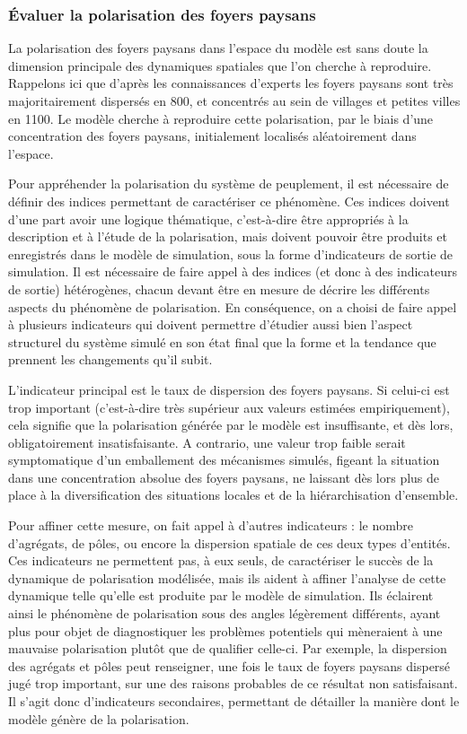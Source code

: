 \subsubsection{Évaluer la polarisation des foyers paysans \label{subsub:polarisation}}

La polarisation des foyers paysans dans l'espace du modèle est sans doute la dimension principale des dynamiques spatiales que l'on cherche à reproduire.
Rappelons ici que d'après les connaissances d'experts les foyers paysans sont très majoritairement dispersés en 800, et concentrés au sein de villages et petites villes en 1100.
Le modèle cherche à reproduire cette polarisation, par le biais d'une concentration des foyers paysans, initialement localisés aléatoirement dans l'espace.

Pour appréhender la polarisation du système de peuplement, il est nécessaire de définir des indices permettant de caractériser ce phénomène.
Ces indices doivent d'une part avoir une logique thématique, c'est-à-dire être appropriés à la description et à l'étude de la polarisation, mais doivent pouvoir être produits et enregistrés dans le modèle de simulation, sous la forme d'indicateurs de sortie de simulation.
Il est nécessaire de faire appel à des indices (et donc à des indicateurs de sortie) hétérogènes, chacun devant être en mesure de décrire les différents aspects du phénomène de polarisation.
En conséquence, on a choisi de faire appel à plusieurs indicateurs qui doivent permettre d'étudier aussi bien l'aspect structurel du système simulé en son état final que la forme et la tendance que prennent les changements qu'il subit.

L'indicateur principal est le taux de dispersion des foyers paysans.
Si celui-ci est trop important (c'est-à-dire très supérieur aux valeurs estimées empiriquement), cela signifie que la polarisation générée par le modèle est insuffisante, et dès lors, obligatoirement insatisfaisante.
A contrario, une valeur trop faible serait symptomatique d'un emballement des mécanismes simulés, figeant la situation dans une concentration absolue des foyers paysans, ne laissant dès lors plus de place à la diversification des situations locales et de la hiérarchisation d'ensemble.

Pour affiner cette mesure, on fait appel à d'autres indicateurs :
le nombre d'agrégats, de pôles, ou encore la dispersion spatiale de ces deux types d'entités.
Ces indicateurs ne permettent pas, à eux seuls, de caractériser le succès de la dynamique de polarisation modélisée, mais ils aident à affiner l'analyse de cette dynamique telle qu'elle est produite par le modèle de simulation.
Ils éclairent ainsi le phénomène de polarisation sous des angles légèrement différents, ayant plus pour objet de diagnostiquer les problèmes potentiels qui mèneraient à une mauvaise polarisation plutôt que de qualifier celle-ci.
Par exemple, la dispersion des agrégats et pôles peut renseigner, une fois le taux de foyers paysans dispersé jugé trop important, sur une des raisons probables de ce résultat non satisfaisant.
Il s'agit donc d'indicateurs secondaires, permettant de détailler la manière dont le modèle génère de la polarisation.


